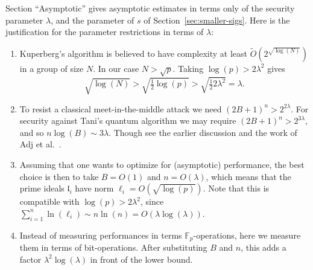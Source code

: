 \documentclass{llncs}
\newcommand{\F}{\mathbb{F}}
\renewcommand{\l}{\mathfrak{l}}
\begin{document}
Section ``Asymptotic'' gives asymptotic estimates in terms only of the security parameter $\lambda$, and the parameter of $s$ of Section~\ref{sec:smaller-sigs}.
Here is the justification for the parameter restrictions in terms of $\lambda$:
\begin{enumerate}
\item Kuperberg's algorithm is believed to have complexity at least $\tilde{O}( 2^{\sqrt{\log(N)}} )$ in a group of size $N$. In our case $N > \sqrt{p}$. Taking $\log(p) > 2 \lambda^2$ gives 
\[
   \sqrt{ \log(N)} > \sqrt{ \tfrac{1}{2} \log(p) } > \sqrt{ \tfrac{1}{2} 2 \lambda^2 } = \lambda.
\]

\item 
To resist a classical meet-in-the-middle attack we need $(2B+1)^n > 2^{2 \lambda}$.
For security against Tani's quantum algorithm we may require $(2B+1)^n > 2^{3 \lambda}$, and so $n \log(B) \sim 3 \lambda$.
Though see the earlier discussion and the work of Adj  et al.~\cite{adj+menezes+al-isogenies}.



%

\item Assuming that one wants to optimize for (asymptotic) performance, the best choice is then to take $B=O(1)$ and $n=O(\lambda)$, which means that the prime ideals $\l_i$ have norm $\ell_i = O( \sqrt{\log(p)} )$. Note that this is compatible with $\log(p)>2\lambda^2$, since $\sum_{i=1}^n\ln(\ell_i)\sim n\ln(n) = O(\lambda\log(\lambda))$.

\item Instead of measuring performances in terms $\F_p$-operations, here we measure them in terms of bit-operations. After substituting $B$ and $n$, this adds a factor $\lambda^2\log(\lambda)$ in front of the lower bound.

\end{enumerate}
\end{document}
